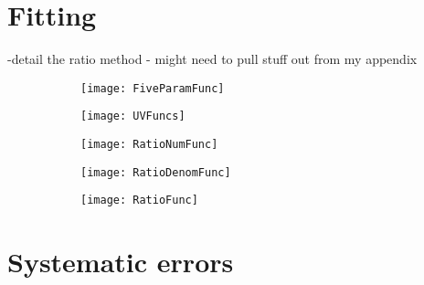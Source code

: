 \section{Fitting}
\label{sec:Fitting}


-detail the ratio method - might need to pull stuff out from my appendix


    \begin{figure}[]
    \centering
        \begin{subfigure}[t]{0.45\textwidth}
            \centering
            \texttt{[image: FiveParamFunc]}
            \caption{}
        \end{subfigure}%

        \vspace{2mm}
        \begin{subfigure}[t]{0.45\textwidth}
            \centering
            \texttt{[image: UVFuncs]}
            \caption{}
        \end{subfigure}
        \begin{subfigure}[t]{0.45\textwidth}
            \centering
            \texttt{[image: RatioNumFunc]}
            \caption{}
        \end{subfigure}%
        \vspace{2mm}
        \begin{subfigure}[t]{0.45\textwidth}
            \centering
            \texttt{[image: RatioDenomFunc]}
            \caption{}
        \end{subfigure}
        \begin{subfigure}[t]{0.45\textwidth}
            \centering
            \texttt{[image: RatioFunc]}
            \caption{}
        \end{subfigure}%
    \caption[]{}
    \label{}
    \end{figure}






\section{Systematic errors}
\label{sec:Systematic Errors}



\cleardoublepage
